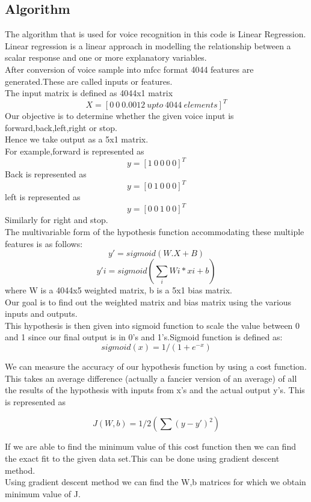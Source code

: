 \documentclass[12pt,letterpaper]{article}
\newcommand{\<}{\langle}
\renewcommand{\>}{\rangle}
\theoremstyle{definition}
\begin{document}
\subsection{Algorithm}
The algorithm that is used for voice recognition in this code is Linear Regression.\\
Linear regression is a linear approach in modelling the relationship between a scalar response and one or more explanatory variables.\\
After conversion of voice sample into mfcc format 4044 features are generated.These are called inputs or features.\\
The input matrix is defined as 4044x1 matrix $$X=[0\ 0 \ 0.0012\ upto\ 4044\  elements]^T$$
Our objective is to determine whether the given voice input is forward,back,left,right or stop.\\
Hence we take output as a 5x1 matrix.\\ 
For example,forward is represented as $$y=[1\ 0\ 0\ 0\ 0]^T$$ 
Back is represented as $$y=[0\ 1\ 0\ 0\ 0]^T$$ 
left is represented as $$y=[0\ 0\ 1\ 0\ 0]^T$$ 
Similarly for right and stop.\\
The multivariable form of the hypothesis function accommodating these multiple features is as follows:
$$y'= sigmoid(W.X + B)$$ 
$$y'i=sigmoid(\sum_{i} Wi*xi + b)$$
where W is a 4044x5 weighted matrix, b is a 5x1 bias matrix.\\Our goal is to find out the weighted matrix and bias matrix using the various inputs and outputs.\\

This hypothesis is then given into sigmoid function to scale the value between 0 and 1 since our final output is in 0's and 1's.Sigmoid function is defined as:
$$sigmoid(x)=1/(1+e^{-x})$$ 

We can measure the accuracy of our hypothesis function by using a cost function. This takes an average difference (actually a fancier version of an average) of all the results of the hypothesis with inputs from x's and the actual output y's.
This is represented as 

$$J(W,b)=1/2(\sum (y-y')^2)$$

If we are able to find the minimum value of this cost function then we can find the exact fit to the given data set.This can be done using gradient descent method.\\
Using gradient descent method we can find the W,b matrices for which we obtain minimum value of J.
\end{document}
